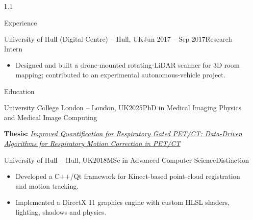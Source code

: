 \documentclass{cv}
\begin{document}
\begin{spacing}{1.1}
\begin{rSection}{Experience}
            \item \begin{rSubsection}{University of Hull (Digital Centre) \textnormal{-- Hull, UK}}{Jun 2017 -- Sep 2017}{Research Intern}{}
                \item \begin{itemize}
                    \item Designed and built a drone-mounted rotating-LiDAR scanner for 3D room mapping; contributed to an experimental autonomous-vehicle project.
                \end{itemize}
            \end{rSubsection}
        \end{rSection}
        
        \begin{rSection}{Education}
            \vspace{-0.35cm}
            
            \item \begin{rSubsection}{University College London \textnormal{-- London, UK}}{2025}{PhD in Medical Imaging Physics and Medical Image Computing}{}
                \item \textbf{Thesis:} \href{https://discovery.ucl.ac.uk/id/eprint/10212970/}{\textit{Improved Quantification for Respiratory Gated PET/CT: Data-Driven Algorithms for Respiratory Motion Correction in PET/CT}}
            \end{rSubsection}
        
            \item \begin{rSubsection}{University of Hull \textnormal{-- Hull, UK}}{2018}{MSc in Advanced Computer Science}{Distinction}
                \item \begin{itemize}
                    \item Developed a C++/Qt framework for Kinect-based point-cloud registration and motion tracking.
                    \item Implemented a DirectX 11 graphics engine with custom HLSL shaders, lighting, shadows and physics.
                \end{itemize}
            \end{rSubsection}
        

\end{rSection}
\end{spacing}
\end{document}
